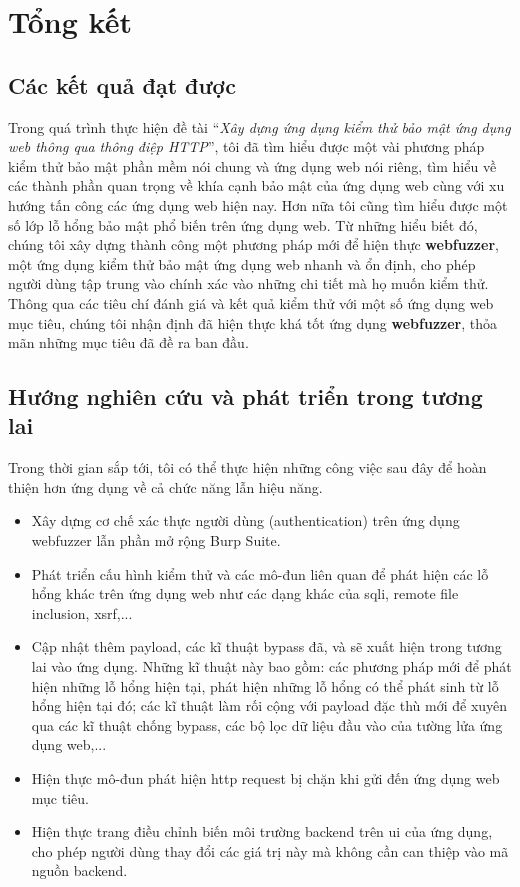 \chapter{Tổng kết}
\section{Các kết quả đạt được}
Trong quá trình thực hiện đề tài ``\textit{Xây dựng ứng dụng kiểm thử bảo mật ứng dụng web thông qua thông điệp HTTP}'', tôi đã tìm hiểu được một vài phương pháp kiểm thử bảo mật phần mềm nói chung và ứng dụng web nói riêng, tìm hiểu về các thành phần quan trọng về khía cạnh bảo mật của ứng dụng web cùng với xu hướng tấn công các ứng dụng web hiện nay. Hơn nữa tôi cũng tìm hiểu được một số lớp lỗ hổng bảo mật phổ biến trên ứng dụng web. Từ những hiểu biết đó, chúng tôi xây dựng thành công một phương pháp mới để hiện thực \textbf{webfuzzer}, một ứng dụng kiểm thử bảo mật ứng dụng web nhanh và ổn định, cho phép người dùng tập trung vào chính xác vào những chi tiết mà họ muốn kiểm thử. Thông qua các tiêu chí đánh giá và kết quả kiểm thử với một số ứng dụng web mục tiêu, chúng tôi nhận định đã hiện thực khá tốt ứng dụng \textbf{webfuzzer}, thỏa mãn những mục tiêu đã đề ra ban đầu.

\section{Hướng nghiên cứu và phát triển trong tương lai}
Trong thời gian sắp tới, tôi có thể thực hiện những công việc sau đây để hoàn thiện hơn ứng dụng về cả chức năng lẫn hiệu năng.
\begin{itemize}
    \item Xây dựng cơ chế xác thực người dùng (authentication) trên ứng dụng webfuzzer lẫn phần mở rộng Burp Suite.
    \item Phát triển cấu hình kiểm thử và các mô-đun liên quan để phát hiện các lỗ hổng khác trên ứng dụng web như các dạng khác của \acrshort{sqli}, remote file inclusion, \acrshort{xsrf},...
    \item Cập nhật thêm payload, các kĩ thuật bypass đã, và sẽ xuất hiện trong tương lai vào ứng dụng. Những kĩ thuật này bao gồm: các phương pháp mới để phát hiện những lỗ hổng hiện tại, phát hiện những lỗ hổng có thể phát sinh từ lỗ hổng hiện tại đó; các kĩ thuật làm rối cộng với payload đặc thù mới để xuyên qua các kĩ thuật chống bypass, các bộ lọc dữ liệu đầu vào của tường lửa ứng dụng web,...
    \item Hiện thực mô-đun phát hiện \acrshort{http} request bị chặn khi gửi đến ứng dụng web mục tiêu.
    \item Hiện thực trang điều chỉnh biến môi trường backend trên \acrshort{ui} của ứng dụng, cho phép người dùng thay đổi các giá trị này mà không cần can thiệp vào mã nguồn backend.
\end{itemize}